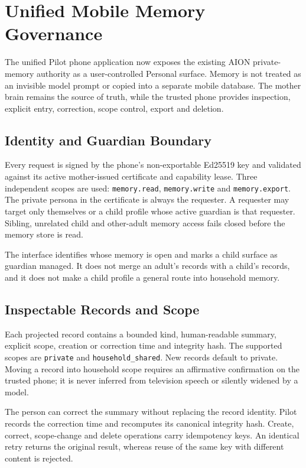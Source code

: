 \begingroup
\sloppy
\section{Unified Mobile Memory Governance}
\label{sec:pilot-unified-mobile-memory}

The unified Pilot phone application now exposes the existing AION private-memory authority as a
user-controlled Personal surface.  Memory is not treated as an invisible model prompt or copied
into a separate mobile database.  The mother brain remains the source of truth, while the trusted
phone provides inspection, explicit entry, correction, scope control, export and deletion.

\subsection{Identity and Guardian Boundary}

Every request is signed by the phone's non-exportable Ed25519 key and validated against its active
mother-issued certificate and capability lease.  Three independent scopes are used:
\texttt{memory.read}, \texttt{memory.write} and \texttt{memory.export}.  The private persona in
the certificate is always the requester.  A requester may target only themselves or a child profile
whose active guardian is that requester.  Sibling, unrelated child and other-adult memory access
fails closed before the memory store is read.

The interface identifies whose memory is open and marks a child surface as guardian managed.  It
does not merge an adult's records with a child's records, and it does not make a child profile a
general route into household memory.

\subsection{Inspectable Records and Scope}

Each projected record contains a bounded kind, human-readable summary, explicit scope, creation or
correction time and integrity hash.  The supported scopes are \texttt{private} and
\texttt{household\_shared}.  New records default to private.  Moving a record into household scope
requires an affirmative confirmation on the trusted phone; it is never inferred from television
speech or silently widened by a model.

The person can correct the summary without replacing the record identity.  Pilot records the
correction time and recomputes its canonical integrity hash.  Create, correct, scope-change and
delete operations carry idempotency keys.  An identical retry returns the original result, whereas
reuse of the same key with different content is rejected.

